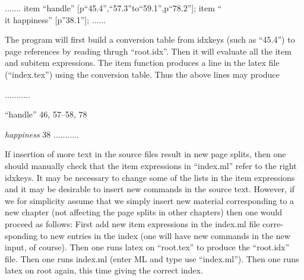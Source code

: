               .......
              item ``handle'' [p``45.4'',``57.3''to``59.1'',p``78.2''];
              item ``{\\it happiness}'' [p''38.1''];
              ......
 
The program will first build a conversion table from idxkeys
(such as ``45.4'') to page references by reading thrugh
``root.idx''. Then it will evaluate all the item and subitem
expressions. The item function produces a line in the
latex file (``index.tex'') using the conversion table.
Thus the above lines may produce

               ...........
               \item ``handle'' 46, 57--58, 78
               \item {\it happiness} 38
               ...........

If insertion of more text in the source files result in 
new page splits, then one should manually check that
the item expressions in ``index.ml'' refer to the
right idxkeys. It may be necessary to change some of the
lists in the item expressions and it may be desirable to
insert new \index commands in the source text. However,
if we for simplicity assume that we simply insert new
material corresponding to a new chapter (not affecting
the page splits in other chapters) then one would proceed
as follows:
First add new item expressions in the index.ml file corre-
sponding to new entries in the index (one will have new
\index commands in the new input, of course). Then one
runs latex on ``root.tex'' to produce the ``root.idx'' file. 
Then one runs index.ml (enter ML and type use ``index.ml'').
Then one runs latex on root again, this time giving the 
correct index.





